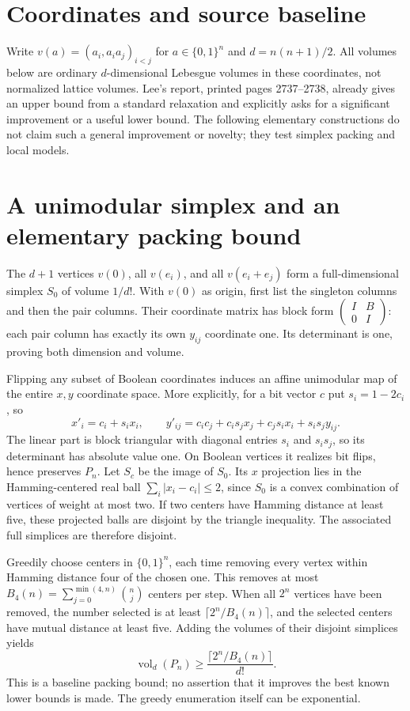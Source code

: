 \documentclass[11pt]{article}
\begin{document}
\section{Coordinates and source baseline}
Write $v(a)=(a_i,a_i a_j)_{i<j}$ for $a\in\{0,1\}^n$ and
$d=n(n+1)/2$. All volumes below are ordinary $d$-dimensional Lebesgue
volumes in these coordinates, not normalized lattice volumes.
Lee's report, printed pages 2737--2738, already gives an upper bound from a
standard relaxation and explicitly asks for a significant improvement or a
useful lower bound. The following elementary constructions do not claim such
a general improvement or novelty; they test simplex packing and local models.

\section{A unimodular simplex and an elementary packing bound}
The $d+1$ vertices
$v(0)$, all $v(e_i)$, and all $v(e_i+e_j)$ form a full-dimensional simplex
$S_0$ of volume $1/d!$. With $v(0)$ as origin, first list the singleton
columns and then the pair columns. Their coordinate matrix has block form
$\left(\begin{smallmatrix}I& B\\0&I\end{smallmatrix}\right)$: each pair
column has exactly its own $y_{ij}$ coordinate one. Its determinant is one,
proving both dimension and volume.

Flipping any subset of Boolean coordinates induces an affine unimodular
map of the entire $x,y$ coordinate space. More explicitly, for a bit vector
$c$ put $s_i=1-2c_i$, so
\[
x'_i=c_i+s_i x_i,\qquad
y'_{ij}=c_i c_j+c_i s_jx_j+c_j s_i x_i+s_i s_jy_{ij}.
\]
The linear part is block triangular with diagonal entries $s_i$ and
$s_i s_j$, so its determinant has absolute value one. On Boolean vertices
it realizes bit flips, hence preserves $P_n$. Let $S_c$ be the image of
$S_0$. Its $x$ projection lies in the Hamming-centered real ball
$\sum_i|x_i-c_i|\le2$, since $S_0$ is a convex combination of vertices of
weight at most two. If two centers have Hamming distance at least five,
these projected balls are disjoint by the triangle inequality. The associated
full simplices are therefore disjoint.

Greedily choose centers in $\{0,1\}^n$, each time removing every vertex
within Hamming distance four of the chosen one. This removes at most
$B_4(n)=\sum_{j=0}^{\min(4,n)}\binom nj$ centers per step. When all $2^n$
vertices have been removed, the number selected is at least
$\lceil2^n/B_4(n)\rceil$, and the selected centers have mutual distance
at least five. Adding the volumes of their disjoint simplices yields
\[
\operatorname{vol}_d(P_n)\ge
\frac{\lceil2^n/B_4(n)\rceil}{d!}.
\]
This is a baseline packing bound; no assertion that it improves the best
known lower bounds is made. The greedy enumeration itself can be exponential.
\end{document}
